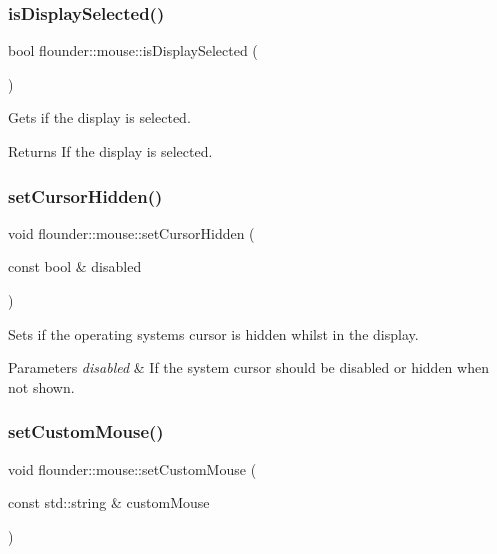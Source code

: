 \subsubsection{\texorpdfstring{is\+Display\+Selected()}{isDisplaySelected()}}
{\footnotesize\ttfamily bool flounder\+::mouse\+::is\+Display\+Selected (\begin{DoxyParamCaption}{ }\end{DoxyParamCaption})}



Gets if the display is selected. 

\begin{DoxyReturn}{Returns}
If the display is selected. 
\end{DoxyReturn}
\mbox{\label{classflounder_1_1mouse_aff9750c7d68e93aea4c2d3c447677a9e}} 
\subsubsection{\texorpdfstring{set\+Cursor\+Hidden()}{setCursorHidden()}}
{\footnotesize\ttfamily void flounder\+::mouse\+::set\+Cursor\+Hidden (\begin{DoxyParamCaption}\item[{const bool \&}]{disabled }\end{DoxyParamCaption})}



Sets if the operating systems cursor is hidden whilst in the display. 


\begin{DoxyParams}{Parameters}
{\em disabled} & If the system cursor should be disabled or hidden when not shown. \\
\hline
\end{DoxyParams}
\mbox{\label{classflounder_1_1mouse_ab6b1c2f498e6fdef0a2ff827ef93928a}} 
\subsubsection{\texorpdfstring{set\+Custom\+Mouse()}{setCustomMouse()}}
{\footnotesize\ttfamily void flounder\+::mouse\+::set\+Custom\+Mouse (\begin{DoxyParamCaption}\item[{const std\+::string \&}]{custom\+Mouse }\end{DoxyParamCaption})}



